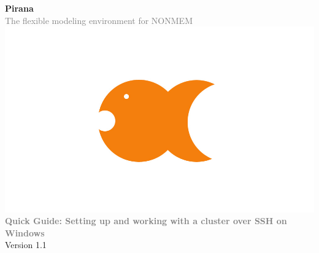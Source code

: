 \documentclass[a4,10pt]{article} \usepackage[pdftex]{graphicx}
\renewcommand{\emph}[1]{\textbf{\textcolor{Grey}{#1}}}
\begin{document}
{\centering
  \vspace{-100pt}
  \textbf{
    \textcolor{PiranaOrange}{\Large Pirana}
  }\\
  \vspace{5pt} \scriptsize \textcolor{Grey}{The flexible modeling
    environment for NONMEM} \\ \normalsize
  \vspace{12pt}
  \hspace{5pt}\includegraphics[scale=0.14]{images/pirana_logo.jpg}\\
  \vspace{18pt}
  {\large
    \emph{Quick Guide: Setting up and working with a cluster over SSH on Windows}  \vspace{10pt} \\
    Version 1.1
  }

}
\vspace{25pt}


\end{document}
